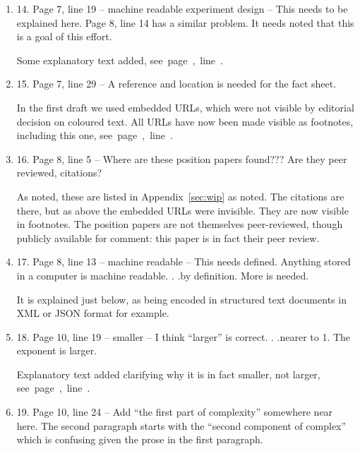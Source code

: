 \documentclass[gmd,manuscript]{copernicus}
\newcommand{\plref}[1]{\mbox{see page \pageref{p-#1}, line
    \lineref{l-#1}.}}
\newenvironment{answer}{\color{blue}}{}
\begin{document}
\begin{enumerate}[label=RC1-\arabic*,leftmargin=*]
  \begin{answer}
    Some explanatory text added, \plref{RC1-13}
  \end{answer}
\item 14. Page 7, line 19 -- machine readable experiment design -- This
  needs to be explained here. Page 8, line 14 has a similar problem.
  It needs noted that this is a goal of this effort.

  \begin{answer}
    Some explanatory text added, \plref{RC1-14}
  \end{answer}
\item 15. Page 7, line 29 -- A reference and location is needed for the
  fact sheet.

  \begin{answer}
    In the first draft we used embedded URLs, which were not visible
    by editorial decision on coloured text. All URLs have now been
    made visible as footnotes, including this one, \plref{RC1-15}
  \end{answer}
\item 16. Page 8, line 5 -- Where are these position papers found???
  Are they peer reviewed, citations?

  \begin{answer}
    As noted, these are listed in Appendix~\ref{sec:wip} as noted. The
    citations are there, but as above the embedded URLs were
    invisible. They are now visible in footnotes. The position papers
    are not themselves peer-reviewed, though publicly available for
    comment: this paper is in fact their peer review.
  \end{answer}
\item 17. Page 8, line 13 -- machine readable -- This needs defined.
  Anything stored in a computer is machine readable. . .by definition.
  More is needed.

  \begin{answer}
    It is explained just below, as being encoded in structured text
    documents in XML or JSON format for example.
  \end{answer}
\item 18. Page 10, line 19 -- smaller -- I think “larger” is correct. .
  .nearer to 1. The exponent is larger.

  \begin{answer}
    Explanatory text added clarifying why it is in fact smaller, not
    larger, \plref{RC1-18}
  \end{answer}
\item 19. Page 10, line 24 -- Add “the first part of complexity”
  somewhere near here. The second paragraph starts with the “second
  component of complex” which is confusing given the prose in the
  first paragraph.


\end{enumerate}
\end{document}
